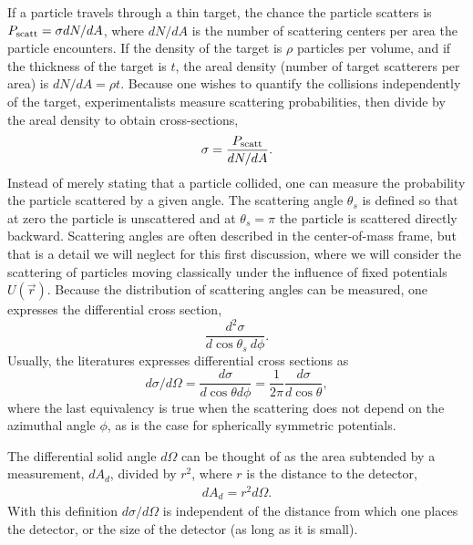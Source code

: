 If a particle travels through a thin target, the chance the particle scatters is $P_{\rm scatt}=\sigma dN/dA$, where $dN/dA$ is the number of scattering centers per area the particle encounters. If the density of the target is $\rho$ particles per volume, and if the thickness of the target is $t$, the areal density (number of target scatterers per area) is $dN/dA=\rho t$. Because one wishes to quantify the collisions independently of the target, experimentalists measure scattering probabilities, then divide by the areal density to obtain cross-sections,
\begin{eqnarray}
\sigma=\frac{P_{\rm scatt}}{dN/dA}.
\end{eqnarray}
Instead of merely stating that a particle collided, one can measure the probability the particle scattered by a given angle. The scattering angle $\theta_s$ is defined so that at zero the particle is unscattered and at $\theta_s=\pi$ the particle is scattered directly backward. Scattering angles are often described in the center-of-mass frame, but that is a detail we will neglect for this first discussion, where we will consider the scattering of particles moving classically under the influence of fixed potentials $U(\vec{r})$. Because the distribution of scattering angles can be measured, one expresses the differential cross section,
\begin{equation}
\frac{d^2\sigma}{d\cos\theta_s~d\phi}.
\end{equation}
Usually, the literatures expresses differential cross sections as
\begin{equation}
d\sigma/d\Omega=\frac{d\sigma}{d\cos\theta d\phi}=\frac{1}{2\pi}\frac{d\sigma}{d\cos\theta},
\end{equation}
where the last equivalency is true when the scattering does not depend on the azimuthal angle $\phi$, as is the case for spherically symmetric potentials. 

The differential solid angle $d\Omega$ can be thought of as the area subtended by a measurement, $dA_d$, divided by $r^2$, where $r$ is the distance to the detector,
\begin{eqnarray}
dA_d=r^2 d\Omega.
\end{eqnarray}
With this definition $d\sigma/d\Omega$ is independent of the distance from which one places the detector, or the size of the detector (as long as it is small).

